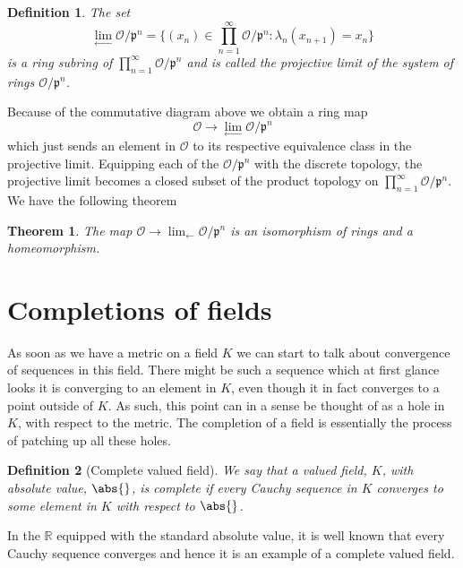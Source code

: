 \documentclass{article}
\newtheorem{theorem}{Theorem}[section]
\newtheorem{definition}{Definition}[section]
\newcommand{\mfrak}[1]{\mathfrak{#1}}
\newcommand{\mcal}[1]{\mathcal{#1}}
\newcommand{\mbb}[1]{\mathbb{#1}}
\begin{document}
\begin{definition}
    The set
    $$\lim_{\leftarrow} \mcal O / \mfrak p^n = \{ (x_n) \in \prod_{n=1}^\infty \mcal O / \mfrak p^n : \lambda_n(x_{n+1}) = x_n \}$$
    is a ring subring of $\prod_{n=1}^\infty \mcal O / \mfrak p^n$ and is called the projective limit of the system of rings $\mcal O / \mfrak p^n$.
\end{definition}

Because of the commutative diagram above we obtain a ring map 
$$\mcal O \to \lim_{\leftarrow} \mcal O / \mfrak p^n$$
which just sends an element in $\mcal O$ to its respective equivalence class in the projective limit. Equipping each of the $\mcal O / \mfrak p^n$ with the discrete topology, the projective limit becomes a closed subset of the product topology on $\prod_{n=1}^\infty \mcal O / \mfrak p^n$. We have the following theorem

\begin{theorem}
    The map $\mcal O \to \lim_{\leftarrow} \mcal O / \mfrak p^n$ is an isomorphism of rings and a homeomorphism.
\end{theorem}


\section{Completions of fields}
As soon as we have a metric on a field $K$ we can start to talk about convergence of sequences in this field. There might be such a sequence which at first glance looks it is converging to an element in $K$, even though it in fact converges to a point outside of $K$. As such, this point can in a sense be thought of as a hole in $K$, with respect to the metric. The completion of a field is essentially the process of patching up all these holes. 



\begin{definition}[Complete valued field]
    We say that a valued field, $K$, with absolute value, $\abs{}$, is complete if every Cauchy sequence in $K$ converges to some element in $K$ with respect to $\abs{}$.
\end{definition}

In the $\mbb R$ equipped with the standard absolute value, it is well known that every Cauchy sequence converges and hence it is an example of a complete valued field. 
\end{document}
